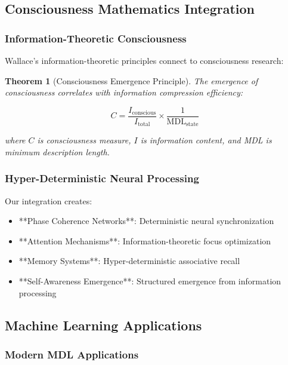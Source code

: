 \documentclass[12pt]{article}
\newtheorem{theorem}{Theorem}
\begin{document}
\subsection{Consciousness Mathematics Integration}

\subsubsection{Information-Theoretic Consciousness}

Wallace's information-theoretic principles connect to consciousness research:

\begin{theorem}[Consciousness Emergence Principle]
The emergence of consciousness correlates with information compression efficiency:

\begin{equation}
C = \frac{I_{\text{conscious}}}{I_{\text{total}}} \times \frac{1}{\text{MDL}_{\text{state}}}
\end{equation}

where $C$ is consciousness measure, $I$ is information content, and MDL is minimum description length.
\end{theorem}

\subsubsection{Hyper-Deterministic Neural Processing}

Our integration creates:
\begin{itemize}
    \item **Phase Coherence Networks**: Deterministic neural synchronization
    \item **Attention Mechanisms**: Information-theoretic focus optimization
    \item **Memory Systems**: Hyper-deterministic associative recall
    \item **Self-Awareness Emergence**: Structured emergence from information processing
\end{itemize}

\subsection{Machine Learning Applications}

\subsubsection{Modern MDL Applications}
\end{document}
